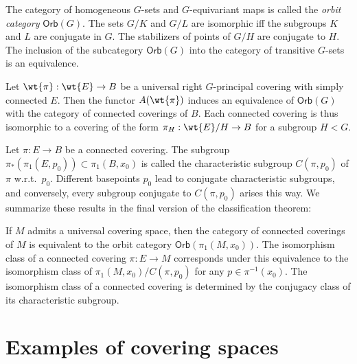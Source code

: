 The category of homogeneous $G$-sets and $G$-equivariant maps is called the \emph{orbit category} $\mathsf{Orb}(G)$. The sets $G\slash K$ and $G\slash L$ are isomorphic iff the subgroups $K$ and $L$ are conjugate in $G$. The stabilizers of points of $G\slash H$ are conjugate to $H$. The inclusion of the subcategory $\mathsf{Orb}(G)$ into the category of transitive $G$-sets is an equivalence.

Let $\wt{\pi}:\wt{E}\to B$ be a universal right $G$-principal covering with simply connected $E$. Then the functor $A(\wt{\pi})$ induces an equivalence of $\mathsf{Orb}(G)$ with the category of connected coverings of $B$. Each connected covering is thus isomorphic to a covering of the form $\pi_H:\wt{E}\slash H\to B$ for a subgroup $H<G$.

Let $\pi:E\to B$ be a connected covering. The subgroup $\pi_\ast(\pi_1(E,p_0))\subset \pi_1(B,x_0)$ is called the characteristic subgroup $C(\pi,p_0)$ of $\pi$ w.r.t.\ $p_0$. Different basepoints $p_0$ lead to conjugate characteristic subgroups, and conversely, every subgroup conjugate to $C(\pi,p_0)$ arises this way. We summarize these results in the final version of the classification theorem:

\begin{thm}
    If $M$ admits a universal covering space, then the category of connected coverings of $M$ is equivalent to the orbit category $\mathsf{Orb}(\pi_1(M,x_0))$. The isomorphism class of a connected covering $\pi:E\to M$ corresponds under this equivalence to the isomorphism class of $\pi_1(M,x_0)\slash C(\pi,p_0)$ for any $p\in\pi^{-1}(x_0)$. The isomorphism class of a connected covering is determined by the conjugacy class of its characteristic subgroup.
\end{thm}







\section{Examples of covering spaces}

